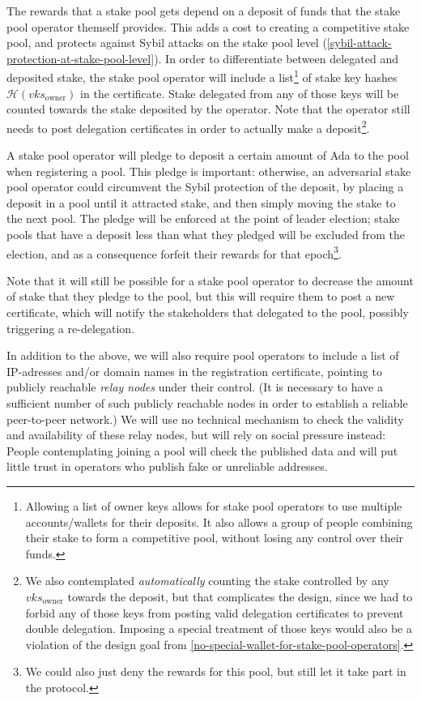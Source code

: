 \documentclass[11pt,a4paper]{article}
\begin{document}
The rewards that a stake pool gets depend on a deposit of funds that the
stake pool operator themself provides. This adds a cost to creating a
competitive stake pool, and protects against Sybil attacks on the stake
pool level (\cref{sybil-attack-protection-at-stake-pool-level}). In order
to differentiate between delegated and deposited stake, the stake pool
operator will include a list\footnote{Allowing a list of owner keys
  allows for stake pool operators to use multiple accounts/wallets for
  their deposits. It also allows a group of people combining their stake
  to form a competitive pool, without losing any control over their
  funds.} of stake key hashes \(\mathcal{H}(vks_\text{owner})\) in the
certificate. Stake delegated from any of those keys will be counted
towards the stake deposited by the operator. Note that the operator
still needs to post delegation certificates in order to actually make a
deposit\footnote{We also contemplated \emph{automatically} counting the
  stake controlled by any \(vks_\text{owner}\) towards the deposit, but
  that complicates the design, since we had to forbid any of those keys
  from posting valid delegation certificates to prevent double
  delegation. Imposing a special treatment of those keys would also be a
  violation of the design goal from
  \cref{no-special-wallet-for-stake-pool-operators}.}.

A stake pool operator will pledge to deposit a certain amount of Ada to
the pool when registering a pool. This pledge is important: otherwise,
an adversarial stake pool operator could circumvent the Sybil protection
of the deposit, by placing a deposit in a pool until it attracted stake,
and then simply moving the stake to the next pool. The pledge will be
enforced at the point of leader election; stake pools that have a
deposit less than what they pledged will be excluded from the election,
and as a consequence forfeit their rewards for that epoch\footnote{We
  could also just deny the rewards for this pool, but still let it take
  part in the protocol.}.

Note that it will still be possible for a stake pool operator to
decrease the amount of stake that they pledge to the pool, but this will
require them to post a new certificate, which will notify the
stakeholders that delegated to the pool, possibly triggering a
re-delegation.

In addition to the above, we will also require pool operators to include
a list of IP-adresses and/or domain names in the registration
certificate, pointing to publicly reachable \emph{relay nodes} under
their control. (It is necessary to have a sufficient number of such
publicly reachable nodes in order to establish a reliable peer-to-peer
network.) We will use no technical mechanism to check the validity and
availability of these relay nodes, but will rely on social pressure
instead: People contemplating joining a pool will check the published
data and will put little trust in operators who publish fake or
unreliable addresses.
\end{document}
